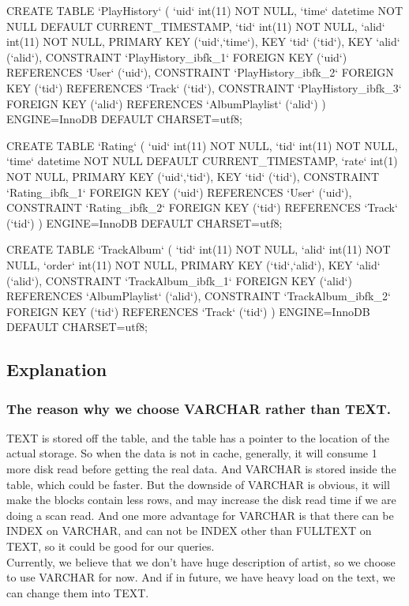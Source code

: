 \documentclass[letterpaper, 12pt]{report}
\begin{document}
\begin{spverbatim}
	CREATE TABLE `PlayHistory` (
	`uid` int(11) NOT NULL,
	`time` datetime NOT NULL DEFAULT CURRENT_TIMESTAMP,
	`tid` int(11) NOT NULL,
	`alid` int(11) NOT NULL,
	PRIMARY KEY (`uid`,`time`),
	KEY `tid` (`tid`),
	KEY `alid` (`alid`),
	CONSTRAINT `PlayHistory_ibfk_1` FOREIGN KEY (`uid`) REFERENCES `User` (`uid`),
	CONSTRAINT `PlayHistory_ibfk_2` FOREIGN KEY (`tid`) REFERENCES `Track` (`tid`),
	CONSTRAINT `PlayHistory_ibfk_3` FOREIGN KEY (`alid`) REFERENCES `AlbumPlaylist` (`alid`)
	) ENGINE=InnoDB DEFAULT CHARSET=utf8;
	
	CREATE TABLE `Rating` (
	`uid` int(11) NOT NULL,
	`tid` int(11) NOT NULL,
	`time` datetime NOT NULL DEFAULT CURRENT_TIMESTAMP,
	`rate` int(1) NOT NULL,
	PRIMARY KEY (`uid`,`tid`),
	KEY `tid` (`tid`),
	CONSTRAINT `Rating_ibfk_1` FOREIGN KEY (`uid`) REFERENCES `User` (`uid`),
	CONSTRAINT `Rating_ibfk_2` FOREIGN KEY (`tid`) REFERENCES `Track` (`tid`)
	) ENGINE=InnoDB DEFAULT CHARSET=utf8;
	
	CREATE TABLE `TrackAlbum` (
	`tid` int(11) NOT NULL,
	`alid` int(11) NOT NULL,
	`order` int(11) NOT NULL,
	PRIMARY KEY (`tid`,`alid`),
	KEY `alid` (`alid`),
	CONSTRAINT `TrackAlbum_ibfk_1` FOREIGN KEY (`alid`) REFERENCES `AlbumPlaylist` (`alid`),
	CONSTRAINT `TrackAlbum_ibfk_2` FOREIGN KEY (`tid`) REFERENCES `Track` (`tid`)
	) ENGINE=InnoDB DEFAULT CHARSET=utf8;
	\end{spverbatim}
	\subsection{Explanation}
	\subsubsection{The reason why we choose VARCHAR rather than TEXT.}
	TEXT is stored off the table, and the table has a pointer to the location of the actual storage. So when the data is not in cache, generally, it will consume 1 more disk read before getting the real data. And VARCHAR is stored inside the table, which could be faster. But the downside of VARCHAR is obvious, it will make the blocks contain less rows, and may increase the disk read time if we are doing a scan read. And one more advantage for VARCHAR is that there can be INDEX on VARCHAR, and can not be INDEX other than FULLTEXT on TEXT, so it could be good for our queries.\\
	Currently, we believe that we don't have huge description of artist, so we choose to use VARCHAR for now. And if in future, we have heavy load on the text, we can change them into TEXT.
	
\end{document}

